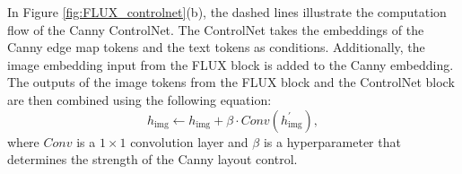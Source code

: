\documentclass{article}
\begin{document}
In Figure \ref{fig:FLUX_controlnet}(b), the dashed lines illustrate the computation flow of the Canny ControlNet. The ControlNet takes the embeddings of the Canny edge map tokens and the text tokens as conditions. Additionally, the image embedding input from the FLUX block is added to the Canny embedding. The outputs of the image tokens from the FLUX block and the ControlNet block are then combined using the following equation:
\begin{equation}
h_{\text{img}} \leftarrow h_{\text{img}} + \beta \cdot Conv(h^{\prime}_{\text{img}}),
\label{eq:controlnet_add}
\end{equation}
where $Conv$ is a $1\times1$ convolution layer and $\beta$ is a hyperparameter that determines the strength of the Canny layout control.



\end{document}
